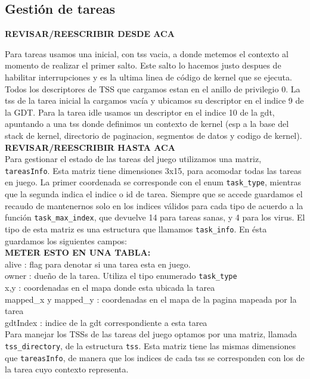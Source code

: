 \subsection{Gestión de tareas}

\textbf{REVISAR/REESCRIBIR DESDE ACA}

Para tareas usamos una inicial, con tss vacia, a donde metemos el contexto al momento de realizar el primer salto. Este salto lo hacemos justo despues de habilitar interrupciones y es la ultima linea de código de kernel que se ejecuta.\\

Todos los descriptores de TSS que cargamos estan en el anillo de privilegio 0.
La tss de la tarea inicial la cargamos vacía y ubicamos su descriptor en el indice 9 de la GDT.
Para la tarea idle usamos un descriptor en el indice 10 de la gdt, apuntando a una tss donde definimos un contexto de kernel (esp a la base del stack de kernel, directorio de paginacion, segmentos de datos y codigo de kernel).\\
\textbf{REVISAR/REESCRIBIR HASTA ACA}\\


Para gestionar el estado de las tareas del juego utilizamos una matriz, \verb|tareasInfo|. Esta matriz tiene dimensiones 3x15, para acomodar todas las tareas en juego. La primer coordenada se corresponde con el enum \verb|task_type|, mientras que la segunda indica el indice o id de tarea. Siempre que se accede guardamos el recaudo de mantenernos solo en los indices válidos para cada tipo de acuerdo a la función \verb|task_max_index|, que devuelve 14 para tareas sanas, y 4 para los virus.
El tipo de esta matriz es una estructura que llamamos \verb|task_info|.
En ésta guardamos los siguientes campos:\\

\textbf{METER ESTO EN UNA TABLA:}\\
alive : flag para denotar si una tarea esta en juego. \\
owner : dueño de la tarea. Utiliza el tipo enumerado \verb|task_type|\\
x,y   : coordenadas en el mapa donde esta ubicada la tarea\\
mapped\_x y mapped\_y : coordenadas en el mapa de la pagina mapeada por la tarea\\
gdtIndex : indice de la gdt correspondiente a esta tarea\\

Para manejar los TSSs de las tareas del juego optamos por una matriz, llamada \verb|tss_directory|, de la estructura \verb|tss|. Esta matriz tiene las mismas dimensiones que \verb|tareasInfo|, de manera que los indices de cada tss se corresponden con los de la tarea cuyo contexto representa. 
\\

